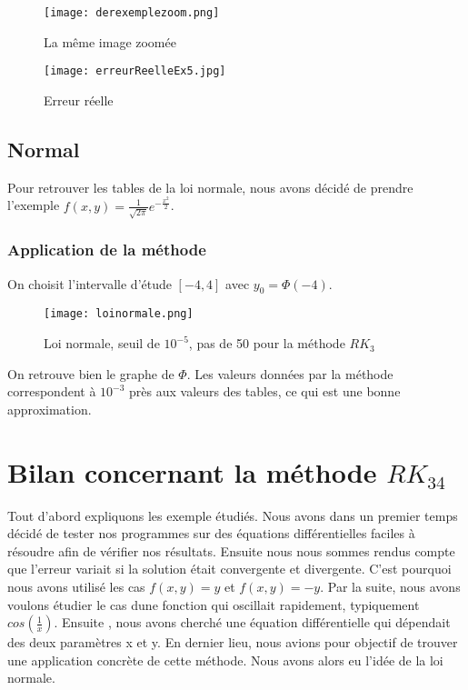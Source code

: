 \documentclass[a4paper, titlepage]{livret} %
\begin{document}
					\begin{figure}[!h]
						\centering
  							\texttt{[image: derexemplezoom.png]}
  							\caption{La même image zoomée}
					\end{figure}

					\begin{figure}[!h]
						\centering
  							\texttt{[image: erreurReelleEx5.jpg]}
  							\caption{Erreur réelle}
					\end{figure}
					\newpage

			\subsection{Normal}
				Pour retrouver les tables de la loi normale, nous avons décidé de prendre l'exemple $f(x,y) = \frac{1}{\sqrt{2\pi}}e^{-\frac{x^{2}}{2}}$.

				\subsubsection{Application de la méthode}
					On choisit l'intervalle d'étude $[-4,4]$ avec $y_{0} = \Phi(-4)$.

					\begin{figure}[!h]
						\centering
  							\texttt{[image: loinormale.png]}
  							\caption{Loi normale, seuil de $10^{-5}$, pas de 50 pour la méthode $RK_{3}$}
					\end{figure}
					\newpage

					On retrouve bien le graphe de $\Phi$.
					Les valeurs données par la méthode correspondent à $10^{-3}$ près aux valeurs des tables, ce qui est une bonne approximation.


		\section{Bilan concernant la méthode $RK_{34}$}
			Tout d'abord expliquons les exemple étudiés. 
			Nous avons dans un premier temps décidé de tester nos programmes sur des équations différentielles faciles à résoudre afin de vérifier nos résultats. 
			Ensuite nous nous sommes rendus compte que l'erreur variait si la solution était convergente et divergente. 
			C'est pourquoi nous avons utilisé les cas $f(x,y) = y$ et $f(x,y) = -y$. 
			Par la suite, nous avons voulons étudier le cas dune fonction qui oscillait rapidement, typiquement $cos\left(\frac{1}{x}\right)$. 
			Ensuite , nous avons cherché une équation différentielle qui dépendait des deux paramètres x et y. 
			En dernier lieu, nous avions pour objectif de trouver une application concrète de cette méthode. 
			Nous avons alors eu l'idée de la loi normale.
\end{document}
